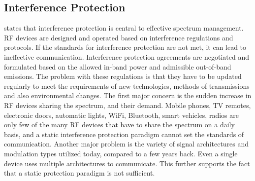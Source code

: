 \subsection{Interference Protection}
\cite{fcc1} states that interference protection is central to effective spectrum
management. RF devices are designed and operated based on interference
regulations and protocols. If the standards for interference protection are not
met, it can lead to ineffective communication. Interference protection
agreements are negotiated and formulated based on the allowed in-band power and
admissible out-of-band emissions. The problem with these regulations is that
they have to be updated regularly to meet the requirements of new technologies,
methods of transmissions and also environmental changes. The first major concern
is the sudden increase in RF devices sharing the spectrum, and their demand.
Mobile phones, TV remotes, electronic doors, automatic lights, WiFi, Bluetooth,
smart vehicles, radios are only few of the many RF devices that have to share
the spectrum on a daily basis, and a static interference protection paradigm
cannot set the standards of communication. Another major problem is the variety
of signal architectures and modulation types utilized today, compared to a few
years back. Even a single device uses multiple architectures to communicate.
This further supports the fact that a static protection paradigm is not
sufficient.

